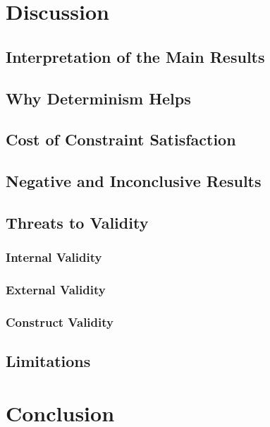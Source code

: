 \documentclass[headsepline,footsepline,footinclude=false,oneside,fontsize=11pt,paper=a4,listof=totoc,bibliography=totoc]{scrbook}
\begin{document}
\chapter{Discussion}\label{ch:discussion}

\section{Interpretation of the Main Results}\label{sec:disc:interpretation}
\section{Why Determinism Helps}\label{sec:disc:determinism}
\section{Cost of Constraint Satisfaction}\label{sec:disc:cost}
\section{Negative and Inconclusive Results}\label{sec:disc:negative}
\section{Threats to Validity}\label{sec:disc:validity}
\subsection{Internal Validity}\label{sec:disc:validity:internal}
\subsection{External Validity}\label{sec:disc:validity:external}
\subsection{Construct Validity}\label{sec:disc:validity:construct}
\section{Limitations}\label{sec:disc:limitations}

\chapter{Conclusion}\label{ch:conclusion}
\end{document}
